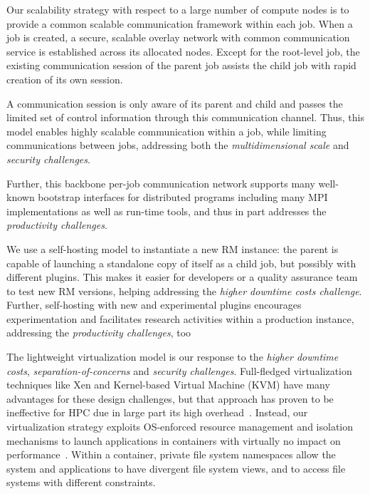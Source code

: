 \vspace{1ex}
Our scalability strategy with respect to a large number 
of compute nodes is to provide a common scalable communication 
framework within each job. When a job is created, a secure, scalable 
overlay network with common communication service is established 
across its allocated nodes. Except for the root-level job, 
the existing communication session of the parent job assists 
the child job with rapid creation of its own session. 

A communication session is only aware of its parent 
and child and passes the limited set of control information 
through this communication channel. Thus, this model 
enables highly scalable communication within a job, while 
limiting communications between jobs, addressing 
both the {\em multidimensional scale} and {\em security challenges}. 

Further, this backbone per-job communication network 
supports many well-known bootstrap interfaces 
for distributed programs including many MPI implementations 
as well as run-time tools, and thus in part addresses 
the {\em productivity challenges}.

\vspace{1ex}
 We use a self-hosting model 
to instantiate a new RM instance: the parent is capable 
of launching a standalone copy of itself as a child job, 
but possibly with different plugins. This makes it easier 
for developers or a quality assurance team to test 
new RM versions, helping addressing the 
{\em higher downtime costs challenge}. Further, self-hosting 
with new and experimental plugins encourages 
experimentation and facilitates research activities 
within a production instance, addressing 
the {\em productivity challenges}, too

\vspace{1ex}
 The lightweight 
virtualization model is our response to the 
{\em higher downtime costs}, {\em separation-of-concerns} 
and {\em security challenges}. Full-fledged virtualization 
techniques like Xen and Kernel-based Virtual Machine (KVM) 
have many advantages for these design challenges, but 
that approach has proven to be ineffective for HPC 
due in large part its high overhead~\cite{VirtHPC}. 
Instead, our virtualization strategy exploits OS-enforced
resource management and isolation mechanisms 
to launch applications in containers with virtually 
no impact on performance~\cite{ContainerVirt}. Within a container, 
private file system namespaces allow the system 
and applications to have divergent file system views, 
and to access file systems with different constraints.

